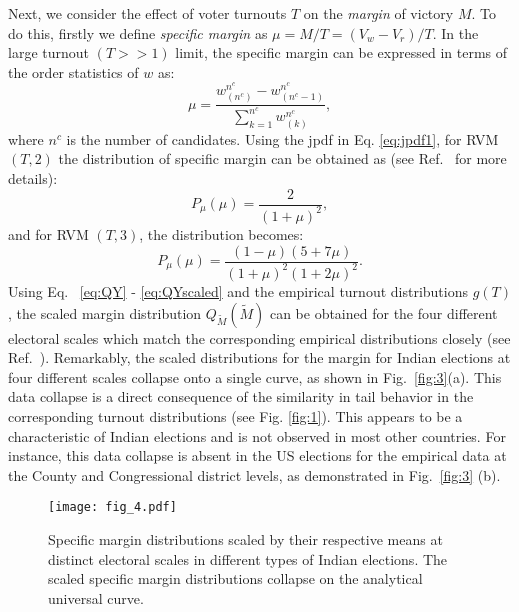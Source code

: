 Next, we consider the effect of voter turnouts $T$ on the \emph{margin} of victory $M$. To do this, firstly we define {\it specific margin} as $\mu = M / T = (V_w - V_r) / T$. In the large turnout $(T >> 1)$ limit, the specific margin can be expressed in terms of the order statistics of $w$ as:
\begin{equation}
    \mu = \frac{w^{n^c}_{(n^c)} - w^{n^c}_{(n^c - 1)}}{\sum_{k = 1}^{n^c}w^{n^c}_{(k)}},
\end{equation}
where $n^c$ is the number of candidates. Using the jpdf in Eq. \ref{eq:jpdf1}, for RVM $(T, 2)$ the distribution of specific margin can be obtained as (see Ref.~\cite{supp} for more details):
\begin{equation}
    P_{\mu}(\mu) = \frac{2}{(1 + \mu)^2},
\end{equation}
and for RVM $(T, 3)$, the distribution becomes:
\begin{equation}
    P_{\mu}(\mu) = \frac{(1 - \mu)(5 + 7\mu)}{(1 + \mu)^2(1 + 2\mu)^2}.
    \label{eq:24}
\end{equation}
Using Eq.~ \ref{eq:QY} - \ref{eq:QYscaled} and the empirical turnout distributions $g(T)$, the scaled margin distribution $Q_{\widetilde{M}}(\widetilde{M})$ can be obtained for the four different electoral scales which match the corresponding empirical distributions closely (see Ref.~\cite{supp}). Remarkably, the scaled distributions for the margin for Indian elections at four different scales collapse onto a single curve, as shown in Fig.~\ref{fig:3}(a). This data collapse is a direct consequence of the similarity in tail behavior in the corresponding turnout distributions (see Fig. \ref{fig:1}). This appears to be a characteristic of Indian elections and is not observed in most other countries. For instance, this data collapse is absent in the US elections for the empirical data at the County and Congressional district levels, as demonstrated in Fig.~\ref{fig:3} (b).
\begin{figure}[t]
    \centering
    \texttt{[image: fig\_4.pdf]}
    \caption{Specific margin distributions scaled by their respective means at distinct electoral scales in different types of Indian elections. The scaled specific margin distributions collapse on the analytical universal curve.}
    \label{fig:4}
\end{figure}

